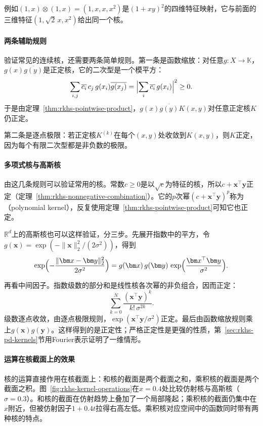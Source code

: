例如$(1,x)\otimes(1,x)=(1,x,x,x^2)$是$(1+xy)^2$的四维特征映射，它与前面的三维特征$(1,\sqrt2\,x,x^2)$给出同一个核。

\paragraph{两条辅助规则}

验证常见的连续核，还需要两条简单规则。第一条是函数缩放：对任意$g:X\to\mathbb K$，$g(x)\overline{g(y)}$是正定核，它的二次型是一个模平方：
\[
\sum_{i,j}\overline{c_i}\,c_j\,g(x_i)\overline{g(x_j)}=\Bigl\lvert\sum_i\overline{c_i}\,g(x_i)\Bigr\rvert^2\geq0 .
\]
于是由定理~\ref{thm:rkhs-pointwise-product}，$g(x)\overline{g(y)}K(x,y)$对任意正定核$K$仍正定。

第二条是逐点极限：若正定核$K^{(k)}$在每个$(x,y)$处收敛到$K(x,y)$，则$K$正定，因为每个有限二次型都是非负数的极限。

\paragraph{多项式核与高斯核}

由这几条规则可以验证常用的核。常数$c\geq0$是以$\sqrt c$为特征的核，所以$c+\bm x^{\top}\bm y$正定（定理~\ref{thm:rkhs-nonnegative-combination}）。它的$p$次幂$(c+\bm x^{\top}\bm y)^p$称为（polynomial kernel），反复使用定理~\ref{thm:rkhs-pointwise-product}可知它也正定。

$\mathbb R^d$上的高斯核也可以这样验证，分三步。先展开指数中的平方，令$g(\bm x)=\exp(-\lVert\bm x\rVert_2^2/(2\sigma^2))$，得到
\[
\exp\Bigl(-\frac{\lVert\bm x-\bm y\rVert_2^2}{2\sigma^2}\Bigr)
=g(\bm x)\,g(\bm y)\,\exp\Bigl(\frac{\bm x^{\top}\bm y}{\sigma^2}\Bigr).
\]

再看中间因子。指数级数的部分和是线性核各次幂的非负组合，因而正定：
\[
\sum_{k=0}^N\frac{(\bm x^{\top}\bm y)^k}{k!\,\sigma^{2k}} .
\]
级数逐点收敛，由逐点极限规则，$\exp(\bm x^{\top}\bm y/\sigma^2)$正定。最后由函数缩放规则乘上$g(\bm x)g(\bm y)$。这样得到的是正定性；严格正定性是更强的性质，第~\ref{sec:rkhs-pd-kernels}节用Fourier表示证明了一维情形。

\paragraph{运算在核截面上的效果}

核的运算直接作用在核截面上：和核的截面是两个截面之和，乘积核的截面是两个截面之积。图~\ref{fig:rkhs-kernel-operations}在$x=0.4$处比较仿射核与高斯核（$\sigma=0.3$）。和核的截面在仿射趋势上叠加了一个局部隆起；乘积核的截面仍集中在$x$附近，但被仿射因子$1+0.4t$拉得右高左低。乘积核对应空间中的函数同时带有两种核的特点。

